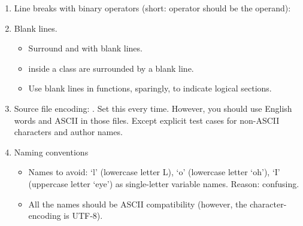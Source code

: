 \documentclass[letterpaper,10pt,english]{sphinxmanual}
\begin{document}
\begin{enumerate}
\item {} 
Line breaks with binary operators (short: operator should be  the operand):

\begin{sphinxVerbatim}[commandchars=\\\{\}]
  
           
             
           
           
\end{sphinxVerbatim}

\item {} 
Blank lines.
\begin{itemize}
\item {} 
Surround  and  with  blank lines.

\item {} 
 inside a class are surrounded by a  blank line.

\item {} 
Use blank lines in functions, sparingly, to indicate logical sections.

\end{itemize}

\item {} 
Source file encoding: . Set this every time. However, you should use English words and ASCII  in those files. Except explicit test cases for non-ASCII characters and author names.

\item {} 
Naming conventions
\begin{itemize}
\item {} 
Names to avoid: ‘l’ (lowercase letter L), ‘o’ (lowercase letter ‘oh’), ‘I’ (uppercase letter ‘eye’) as single-letter variable names. Reason: confusing.

\item {} 
All the names should be ASCII compatibility (however, the character-encoding is UTF-8).


\end{itemize}
\end{enumerate}
\end{document}
